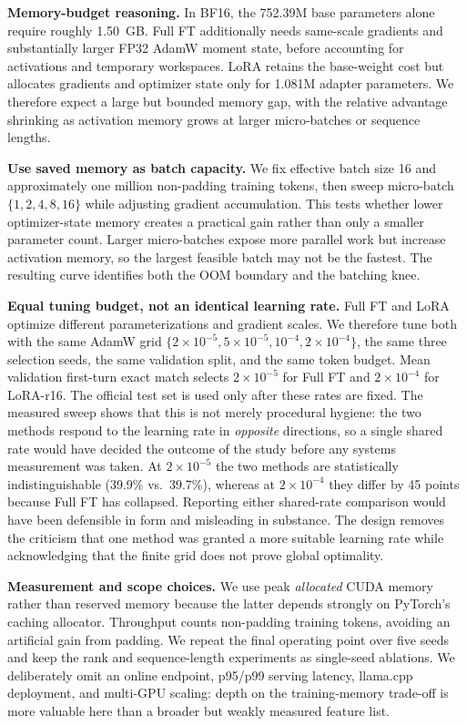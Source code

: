 \documentclass[10pt]{article}
\begin{document}
\textbf{Memory-budget reasoning.} In BF16, the 752.39M base parameters alone require roughly 1.50~GB. Full FT additionally needs same-scale gradients and substantially larger FP32 AdamW moment state, before accounting for activations and temporary workspaces. LoRA retains the base-weight cost but allocates gradients and optimizer state only for 1.081M adapter parameters. We therefore expect a large but bounded memory gap, with the relative advantage shrinking as activation memory grows at larger micro-batches or sequence lengths.

\textbf{Use saved memory as batch capacity.} We fix effective batch size 16 and approximately one million non-padding training tokens, then sweep micro-batch $\{1,2,4,8,16\}$ while adjusting gradient accumulation. This tests whether lower optimizer-state memory creates a practical gain rather than only a smaller parameter count. Larger micro-batches expose more parallel work but increase activation memory, so the largest feasible batch may not be the fastest. The resulting curve identifies both the OOM boundary and the batching knee.

\textbf{Equal tuning budget, not an identical learning rate.} Full FT and LoRA optimize different parameterizations and gradient scales. We therefore tune both with the same AdamW grid $\{2\!\times\!10^{-5},5\!\times\!10^{-5},10^{-4},2\!\times\!10^{-4}\}$, the same three selection seeds, the same validation split, and the same token budget. Mean validation first-turn exact match selects $2\times10^{-5}$ for Full FT and $2\times10^{-4}$ for LoRA-r16. The official test set is used only after these rates are fixed. The measured sweep shows that this is not merely procedural hygiene: the two methods respond to the learning rate in \emph{opposite} directions, so a single shared rate would have decided the outcome of the study before any systems measurement was taken. At $2\times10^{-5}$ the two methods are statistically indistinguishable (39.9\% vs.\ 39.7\%), whereas at $2\times10^{-4}$ they differ by 45 points because Full FT has collapsed. Reporting either shared-rate comparison would have been defensible in form and misleading in substance. The design removes the criticism that one method was granted a more suitable learning rate while acknowledging that the finite grid does not prove global optimality.

\textbf{Measurement and scope choices.} We use peak \emph{allocated} CUDA memory rather than reserved memory because the latter depends strongly on PyTorch's caching allocator. Throughput counts non-padding training tokens, avoiding an artificial gain from padding. We repeat the final operating point over five seeds and keep the rank and sequence-length experiments as single-seed ablations. We deliberately omit an online endpoint, p95/p99 serving latency, llama.cpp deployment, and multi-GPU scaling: depth on the training-memory trade-off is more valuable here than a broader but weakly measured feature list.
\end{document}
